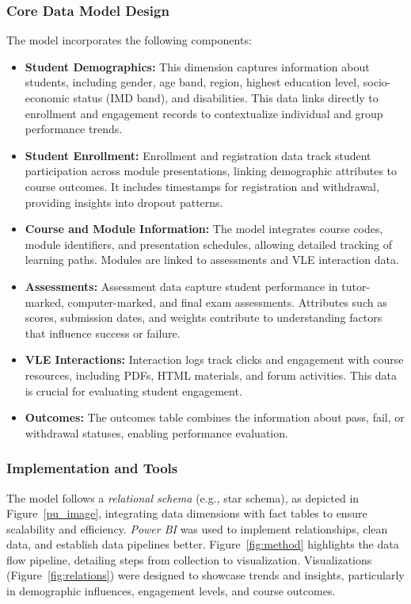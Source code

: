 \subsubsection{Core Data Model Design}
The model incorporates the following components:
\begin{itemize}
    \item \textbf{Student Demographics:} This dimension captures information about students, including gender, age band, region, highest education level, socio-economic status (IMD band), and disabilities. This data links directly to enrollment and engagement records to contextualize individual and group performance trends.
    \item \textbf{Student Enrollment:} Enrollment and registration data track student participation across module presentations, linking demographic attributes to course outcomes. It includes timestamps for registration and withdrawal, providing insights into dropout patterns.
    \item \textbf{Course and Module Information:} The model integrates course codes, module identifiers, and presentation schedules, allowing detailed tracking of learning paths. Modules are linked to assessments and VLE interaction data.
    \item \textbf{Assessments:} Assessment data capture student performance in tutor-marked, computer-marked, and final exam assessments. Attributes such as scores, submission dates, and weights contribute to understanding factors that influence success or failure.
    \item \textbf{VLE Interactions:} Interaction logs track clicks and engagement with course resources, including PDFs, HTML materials, and forum activities. This data is crucial for evaluating student engagement.
    \item \textbf{Outcomes:} The outcomes table combines the information about pass, fail, or withdrawal statuses, enabling performance evaluation.
\end{itemize}

\subsubsection{Implementation and Tools}
The model follows a \textit{relational schema} (e.g., star schema), as depicted in Figure~\ref{pu_image}, integrating data dimensions with fact tables to ensure scalability and efficiency. \textit{Power BI} was used to implement relationships, clean data, and establish data pipelines better. Figure~\ref{fig:method} highlights the data flow pipeline, detailing steps from collection to visualization. Visualizations (Figure~\ref{fig:relations}) were designed to showcase trends and insights, particularly in demographic influences, engagement levels, and course outcomes.

